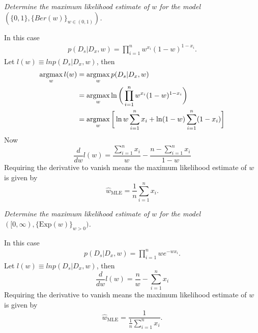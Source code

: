 \begin{example}
	\emph{Determine the maximum likelihood estimate of $w$ for the model $(\{0,1\},\{Ber(w)\}_{w\in(0,1)})$.}\newline
	
	\noindent In this case
	\begin{equation}
		\begin{split}
			p(D_s|D_x,w)=\prod_{i=1}^nw^{x_i}(1-w)^{1-x_i}.
		\end{split}
	\end{equation}
	Let $l(w)\equiv ln p(D_s|D_x,w)$, then
	\begin{equation}
		\begin{split}
			\operatorname*{argmax}_wl(w) & = \operatorname*{argmax}_wp(D_s|D_x,w)\\
			&= \operatorname*{argmax}_w\ln \bigg(\prod_{i=1}^nw^{x_i}(1-w)^{1-x_i}\bigg)\\
			&=\operatorname*{argmax}_w \bigg[\ln w\sum_{i=1}^nx_i + \ln(1-w)\sum_{i=1}^n(1-x_i)\bigg]
		\end{split}
	\end{equation}
	Now 
	\begin{equation}
		\frac{d}{dw}l(w)=\frac{\sum_{i=1}^nx_i}{w}-\frac{n-\sum_{i=1}^nx_i}{1-w}
	\end{equation}
	Requiring the derivative to vanish means the maximum likelihood estimate of $w$ is given by
	\begin{equation}
		\hat{w}_{\text{MLE}}=\frac{1}{n}\sum_{i=1}^nx_i.
	\end{equation}
\end{example}
\begin{example}
	\emph{Determine the maximum likelihood estimate of $w$ for the model $([0,\infty),\{\text{Exp}(w)\}_{w>0})$.}\newline
	
	\noindent In this case
	\begin{equation}
		\begin{split}
			p(D_s|D_x,w)=\prod_{i=1}^nw e^{-w x_i}.
		\end{split}
	\end{equation}
	Let $l(w)\equiv ln p(D_s|D_x,w)$, then
	\begin{equation}
		\frac{d}{dw}l(w)=\frac{n}{w}-\sum_{i=1}^nx_i
	\end{equation}
	Requiring the derivative to vanish means the maximum likelihood estimate of $w$ is given by
	\begin{equation}
		\hat{w}_{\text{MLE}}=\frac{1}{\frac{1}{n}\sum_{i=1}^nx_i}.
	\end{equation}
\end{example}







